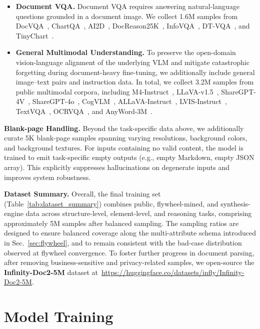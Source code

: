 \begin{itemize}[leftmargin=1.0em, labelsep=0.5em]
    \item \textbf{Document VQA.} Document VQA requires answering natural-language questions grounded in a document image. We collect 1.6M samples from DocVQA~\cite{docvqa}, ChartQA~\cite{chartqa}, AI2D~\cite{ai2d}, DocReason25K~\cite{docreason25k}, InfoVQA~\cite{infovqa}, DT-VQA~\cite{dtvqa}, and TinyChart~\cite{tinychart}.

    \item \textbf{General Multimodal Understanding.} To preserve the open-domain vision-language alignment of the underlying VLM and mitigate catastrophic forgetting during document-heavy fine-tuning, we additionally include general image–text pairs and instruction data. In total, we collect 3.2M samples from public multimodal corpora, including M4-Instruct~\cite{m4instruct}, LLaVA-v1.5~\cite{llava15}, ShareGPT-4V~\cite{sharegpt4v}, ShareGPT-4o~\cite{sharegpt4o}, CogVLM~\cite{cogvlm}, ALLaVA-Instruct~\cite{allava}, LVIS-Instruct~\cite{lvisinstruct4v}, TextVQA~\cite{textvqa}, OCRVQA~\cite{ocrvqa}, and AnyWord-3M~\cite{anyword3m}.
\end{itemize}

\textbf{Blank-page Handling.} Beyond the task-specific data above, we additionally curate 5K blank-page samples spanning varying resolutions, background colors, and background textures. For inputs containing no valid content, the model is trained to emit task-specific empty outputs (e.g., empty Markdown, empty JSON array). This explicitly suppresses hallucinations on degenerate inputs and improves system robustness.

\textbf{Dataset Summary.} Overall, the final training set (Table~\ref{tab:dataset_summary}) combines public, flywheel-mined, and synthesis-engine data across structure-level, element-level, and reasoning tasks, comprising approximately 5M samples after balanced sampling. The sampling ratios are designed to ensure balanced coverage along the multi-attribute schema introduced in Sec.~\ref{sec:flywheel}, and to remain consistent with the bad-case distribution observed at flywheel convergence. To foster further progress in document parsing, after removing business-sensitive and privacy-related samples, we open-source the \textbf{Infinity-Doc2-5M} dataset at~\url{https://huggingface.co/datasets/infly/Infinity-Doc2-5M}.

\section{Model Training}


